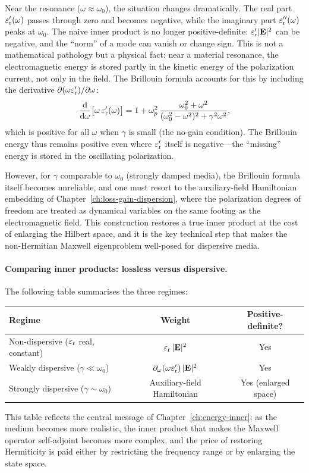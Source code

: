 Near the resonance ($\omega \approx \omega_0$), the situation changes
dramatically. The real part $\varepsilon_{\mathrm{r}}'(\omega)$ passes through zero and
becomes negative, while the imaginary part $\varepsilon_{\mathrm{r}}''(\omega)$ peaks at
$\omega_0$. The naive inner product is no longer positive-definite:
$\varepsilon_{\mathrm{r}}'|\mathbf{E}|^2$ can be negative, and the ``norm'' of a mode can
vanish or change sign. This is not a mathematical pathology but a
physical fact: near a material resonance, the electromagnetic energy is
stored partly in the kinetic energy of the polarization current, not
only in the field. The Brillouin formula accounts for this by
including the derivative $\partial(\omega\varepsilon_{\mathrm{r}}')/\partial\omega$:
\begin{equation}
 \frac{\mathop{}\!\mathrm{d} }{\mathop{}\!\mathrm{d} \omega}\bigl[\omega\,\varepsilon_{\mathrm{r}}'(\omega)\bigr]
 = 1 + \omega_p^2\,\frac{\omega_0^2 + \omega^2}
 {(\omega_0^2 - \omega^2)^2 + \gamma^2\omega^2},
 \label{eq:brillouin-derivative}
\end{equation}
which is positive for all $\omega$ when $\gamma$ is small (the
no-gain condition). The Brillouin energy thus remains positive even
where $\varepsilon_{\mathrm{r}}'$ itself is negative---the ``missing'' energy is stored in
the oscillating polarization.

However, for $\gamma$ comparable to $\omega_0$ (strongly damped media),
the Brillouin formula itself becomes unreliable, and one must resort to
the auxiliary-field Hamiltonian embedding of
Chapter~\ref{ch:loss-gain-dispersion}, where the polarization degrees
of freedom are treated as dynamical variables on the same footing as the
electromagnetic field. This construction restores a true inner product
at the cost of enlarging the Hilbert space, and it is the key technical
step that makes the non-Hermitian Maxwell eigenproblem well-posed for
dispersive media.

\paragraph{Comparing inner products: lossless versus dispersive.}
The following table summarises the three regimes:
\begin{center}
\begin{tabular}{lcc}
 \hline
 \textbf{Regime} & \textbf{Weight} & \textbf{Positive-definite?} \\
 \hline
 Non-dispersive ($\varepsilon_{\mathrm{r}}$ real, constant) &
 $\varepsilon_{\mathrm{r}}\,|\mathbf{E}|^2$ & Yes \\
 Weakly dispersive ($\gamma \ll \omega_0$) &
 $\partial_\omega(\omega\varepsilon_{\mathrm{r}}')\,|\mathbf{E}|^2$ & Yes \\
 Strongly dispersive ($\gamma \sim \omega_0$) &
 Auxiliary-field Hamiltonian & Yes (enlarged space) \\
 \hline
\end{tabular}
\end{center}
This table reflects the central message of Chapter~\ref{ch:energy-inner}:
as the medium becomes more realistic, the inner product that makes the
Maxwell operator self-adjoint becomes more complex, and the price of
restoring Hermiticity is paid either by restricting the frequency range
or by enlarging the state space.

